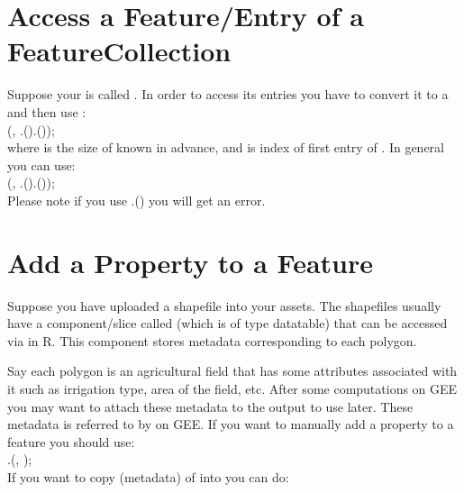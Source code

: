 \section{Access a Feature/Entry of a FeatureCollection}

Suppose your  
is called .
In order to access its entries you have to
convert it to a  and then use :\\

 (,
.().());\\

\noindent where  is the size 
of  known in advance, and
 is index of first entry of . 
In general you can use:\\

 (,
.().());\\

\noindent Please note if you use 
.() 
you will get an error.

\section{Add a Property to a Feature}

Suppose you have uploaded a shapefile 
into your assets. The shapefiles usually have a 
component/slice called  (which is of type datatable) 
that can be
accessed via  in R. This component stores
metadata corresponding to each polygon.

Say each polygon is an agricultural field
that has some attributes associated with it such as irrigation type,
area of the field, etc. After some computations
on GEE you may want to attach these metadata to
the output to use later. These metadata is referred to
by  on GEE. If you want to manually add a
property to a feature you should use:\\

.(, );\\

If you want to copy  (metadata)
of  into  you can do:\\

